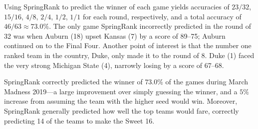 \documentclass[a4paper,twocolumn,aps,prl]{revtex4-1}
\begin{document}
Using SpringRank to predict the winner of each game yields accuracies of $23/32$, $15/16$, $4/8$, $2/4$, $1/2$, $1/1$ for each round, respectively, and a total accuracy of $46/63 \approx 73.0\%$. The only game SpringRank incorrectly predicted in the round of 32 was when Auburn (18) upset Kansas (7) by a score of 89--75; Auburn continued on to the Final Four. Another point of interest is that the number one ranked team in the country, Duke, only made it to the round of 8. Duke (1) faced the very strong Michigan State (4), narrowly losing by a score of 67--68.

SpringRank correctly predicted the winner of $73.0\%$ of the games during March Madness 2019---a large improvement over simply guessing the winner, and a $5\%$ increase from assuming the team with the higher seed would win. Moreover, SpringRank generally predicted how well the top teams would fare, correctly predicting 14 of the teams to make the Sweet 16.


\end{document}
